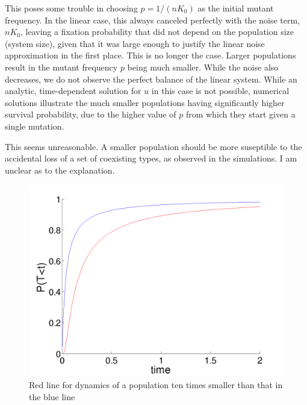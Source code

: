 \documentclass[letterpaper,10pt]{article}
\begin{document}
This poses some trouble in choosing $p = 1/(nK_0)$ as the initial mutant frequency.  In the linear case, this always canceled perfectly with the noise term, $nK_0$, leaving a fixation probability that did not depend on the population size (system size), given that it was large enough to justify the linear noise approximation in the first place.  This is no longer the case.  Larger populations result in the mutant frequency $p$ being much smaller.  While the noise also decreases, we do not observe the perfect balance of the linear system.  While an analytic, time-dependent solution for $u$ in this case is not possible, numerical solutions illustrate the much smaller populations having significantly higher survival probability, due to the higher value of $p$ from which they start given a single mutation.  

This seems unreasonable.  A smaller population should be more suseptible to the accidental loss of a set of coexisting types, as observed in the simulations.  I am unclear as to the explanation.  

\begin{figure}[h]
\begin{center}
\includegraphics[width=\textwidth]{images/u}
\end{center}
\caption{Red line for dynamics of a population ten times smaller than that in the blue line}
\label{fig:u}
\end{figure}
\end{document}
